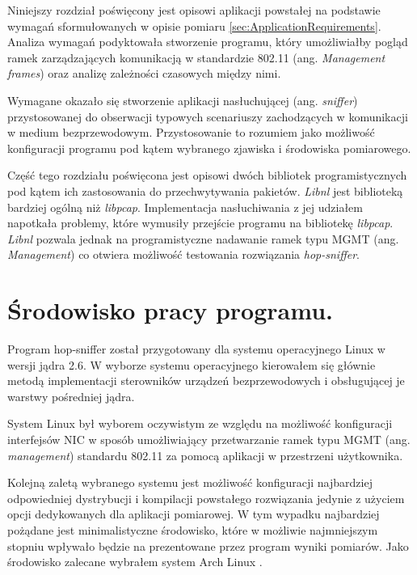 %
 
Niniejszy rozdział poświęcony jest opisowi aplikacji powstałej na podstawie wymagań sformułowanych w opisie pomiaru \ref{sec:ApplicationRequirements}. Analiza wymagań podyktowała stworzenie programu, który umożliwiałby pogląd ramek zarządzających komunikacją w standardzie 802.11 (ang. \emph{Management frames}) oraz analizę zależności czasowych między nimi. 

Wymagane okazało się stworzenie aplikacji nasłuchującej (ang. \emph{sniffer}) przystosowanej do obserwacji typowych scenariuszy zachodzących w komunikacji w medium bezprzewodowym. Przystosowanie to rozumiem jako możliwość konfiguracji programu pod kątem wybranego zjawiska i środowiska pomiarowego. 

Część tego rozdziału poświęcona jest opisowi dwóch bibliotek programistycznych pod kątem ich zastosowania do przechwytywania pakietów. \emph{Libnl} jest biblioteką bardziej ogólną niż \emph{libpcap}. Implementacja nasłuchiwania z jej udziałem napotkała problemy, które wymusiły przejście programu na bibliotekę \emph{libpcap}. \emph{Libnl} pozwala jednak na programistyczne nadawanie ramek typu MGMT (ang. \emph{Management}) co otwiera możliwość testowania rozwiązania \emph{hop-sniffer}.

\section{Środowisko pracy programu.}
\label{sec:ProgramEnviroment}

Program hop-sniffer został przygotowany dla systemu operacyjnego Linux w wersji jądra 2.6. W wyborze systemu operacyjnego kierowałem się głównie metodą implementacji sterowników urządzeń bezprzewodowych i obsługującej je warstwy pośredniej jądra. 

System Linux był wyborem oczywistym ze względu na możliwość konfiguracji interfejsów NIC w sposób umożliwiający przetwarzanie ramek typu MGMT (ang. \emph{management}) standardu 802.11 za pomocą aplikacji w przestrzeni użytkownika.

Kolejną zaletą wybranego systemu jest możliwość konfiguracji najbardziej odpowiedniej dystrybucji i kompilacji powstałego rozwiązania jedynie z użyciem opcji dedykowanych dla aplikacji pomiarowej. W tym wypadku najbardziej pożądane jest minimalistyczne środowisko, które w możliwie najmniejszym stopniu wpływało będzie na prezentowane przez program wyniki pomiarów. Jako środowisko zalecane wybrałem system Arch Linux \cite{www:ArchLinux}.


